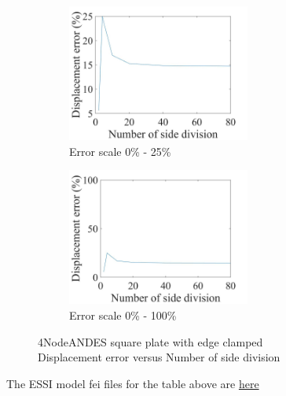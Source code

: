 \documentclass[fleqn,11pt,letter]{article}
\begin{document}
\begin{figure}[H]
  \begin{subfigure}{0.5\textwidth}
    \centering
    \includegraphics[width=6cm]{../Figure_files/4NodeANDES/error4andes_square_plate_clamped.jpeg}
    \caption{Error scale 0\% - 25\%}
  \end{subfigure}
  \begin{subfigure}{0.5\textwidth}
    \centering
    \includegraphics[width=6cm]{../Figure_files/4NodeANDES/error4andes_square_plate_clamped100.jpeg}
    \caption{Error scale 0\% - 100\%}
  \end{subfigure}
  \captionsetup{justification=centering,margin=2cm}
  \caption{4NodeANDES square plate with edge clamped\\
      Displacement error   versus   Number of side division}
  \label{fig 4NodeANDES square plate with edge clamped}
\end{figure}



The ESSI model fei files for the table above are \href{https://github.com/yuan-energy/ESSI_Verification/blob/master/4NodeANDES/square_plate_clamped/square_plate_clamped.tar.gz?raw=true}{here}
















\end{document}
